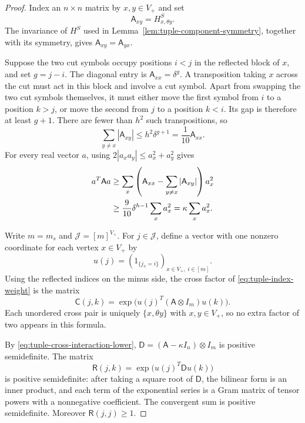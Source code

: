 \begin{proof}
Index an \(n\times n\) matrix by \(x,y\in V_+\) and set
\[
 \mathsf A_{xy}=H^S_{x,\theta y}.
\]
The invariance of \(H^S\) used in
Lemma~\ref{lem:tuple-component-symmetry}, together with its symmetry,
gives \(\mathsf A_{xy}=\mathsf A_{yx}\).

Suppose the two cut symbols occupy positions \(i<j\) in the
reflected block of \(x\), and set \(g=j-i\).  The diagonal entry
is \(\mathsf A_{xx}=\delta^g\).  A transposition taking \(x\)
across the cut must act in this block and involve a cut symbol.
Apart from swapping the two cut symbols themselves, it must either
move the first symbol from \(i\) to a position \(k>j\), or move
the second from \(j\) to a position \(k<i\).  Its gap is therefore
at least \(g+1\).  There are fewer than \(h^2\) such transpositions,
so
\[
 \sum_{y\ne x}|\mathsf A_{xy}|
 \le h^2\delta^{g+1}=\frac1{10}\mathsf A_{xx}.
\]
For every real vector \(a\), using
\(2|a_xa_y|\le a_x^2+a_y^2\) gives
\begin{align}
 a^T\mathsf Aa
 &\ge\sum_x\left(\mathsf A_{xx}
       -\sum_{y\ne x}|\mathsf A_{xy}|\right)a_x^2\notag\\
 &\ge\frac9{10}\delta^{h-1}\sum_xa_x^2
 =\kappa\sum_xa_x^2.
 \label{eq:tuple-cross-interaction-lower}
\end{align}

Write \(m=m_s\) and \(\mathcal J=[m]^{V_+}\).  For
\(j\in\mathcal J\), define a vector with one nonzero coordinate
for each vertex \(x\in V_+\) by
\[
 u(j)=(1_{\{j_x=i\}})_{x\in V_+,\ i\in[m]}.
\]
Using the reflected indices on the minus side, the cross factor of
\eqref{eq:tuple-index-weight} is the matrix
\[
 \mathsf C(j,k)=
 \exp\bigl(u(j)^T(\mathsf A\otimes I_m)u(k)\bigr).
\]
Each unordered cross pair is uniquely \(\{x,\theta y\}\) with
\(x,y\in V_+\), so no extra factor of two appears in this formula.

By \eqref{eq:tuple-cross-interaction-lower},
\(\mathsf D=(\mathsf A-\kappa I_n)\otimes I_m\) is positive
semidefinite.  The matrix
\[
 \mathsf R(j,k)=\exp\bigl(u(j)^T\mathsf D u(k)\bigr)
\]
is positive semidefinite: after taking a square root of
\(\mathsf D\), the bilinear form is an inner product, and each
term of the exponential series is a Gram matrix of tensor powers
with a nonnegative coefficient.  The convergent sum is positive
semidefinite.  Moreover \(\mathsf R(j,j)\ge1\).


\end{proof}
